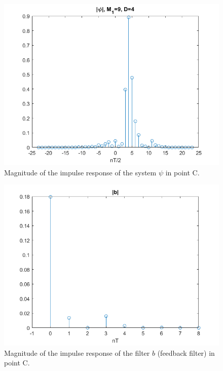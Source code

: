 \documentclass[a4paper,11.5pt]{article}
\begin{document}
\begin{figure}[H]
	\begin{center}   
		\includegraphics[width=\textwidth]{figs/C_psi.png} 
		\caption{Magnitude of the impulse response of the system $\psi$ in point C.}
		\label{fig:C_psi}
	\end{center}
\end{figure}

\begin{figure}[H]
	\begin{center}   
		\includegraphics[width=\textwidth]{figs/C_b.png} 
		\caption{Magnitude of the impulse response of the filter $b$ (feedback filter) in point C.}
		\label{fig:C_b}
	\end{center}
\end{figure}
\end{document}
